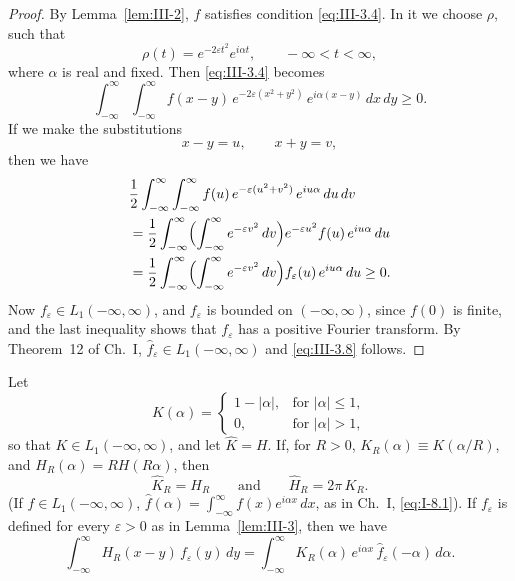 \begin{proof}
By Lemma~\ref{lem:III-2}, $f$ satisfies condition \eqref{eq:III-3.4}. In it we choose $\rho$, such that
\[
\rho(t)=e^{-2\varepsilon t^{2}}e^{i\alpha t},\qquad-\infty<t<\infty,
\]
where $\alpha$ is real and fixed. Then \eqref{eq:III-3.4} becomes
\[
\int_{-\infty}^{\infty}\int_{-\infty}^{\infty}f(x-y)\,e^{-2\varepsilon(x^{2}+y^{2})}\,e^{i\alpha(x-y)}\,dx\,dy\ge0.
\]
If we make the substitutions
\[
x-y=u,\qquad x+y=v,
\]
then we have
\begin{align*}
&\frac12\int_{-\infty}^{\infty}\int_{-\infty}^{\infty}f(u)\,e^{-\varepsilon(u^{2}+v^{2})}\,e^{iu\alpha}\,du\,dv\\
&=\frac12\int_{-\infty}^{\infty}\Bigl(\int_{-\infty}^{\infty}e^{-\varepsilon v^{2}}\,dv\Bigr)e^{-\varepsilon u^{2}}f(u)\,e^{iu\alpha}\,du\\
&=\frac12\int_{-\infty}^{\infty}\Bigl(\int_{-\infty}^{\infty}e^{-\varepsilon v^{2}}\,dv\Bigr)f_{\varepsilon}(u)\,e^{iu\alpha}\,du\ge0.
\end{align*}
Now $f_{\varepsilon}\in L_{1}(-\infty,\infty)$, and $f_{\varepsilon}$ is bounded on $(-\infty,\infty)$, since $f(0)$ is finite, and the last inequality shows that $f_{\varepsilon}$ has a positive Fourier transform. By Theorem~12 of Ch.~I, $\hat f_{\varepsilon}\in L_{1}(-\infty,\infty)$ and \eqref{eq:III-3.8} follows.
\end{proof}

\begin{lemma}\label{lem:III-5}
Let
\[
K(\alpha)=
\begin{cases}
1-|\alpha|,&\text{for }|\alpha|\le1,\\
0,&\text{for }|\alpha|>1,
\end{cases}
\]
so that $K\in L_{1}(-\infty,\infty)$, and let $\hat K=H$. If, for $R>0$, $K_{R}(\alpha)\equiv K(\alpha/R)$, and $H_{R}(\alpha)=RH(R\alpha)$, then
\[
\hat K_{R}=H_{R}\qquad\text{and}\qquad\hat H_{R}=2\pi\,K_{R}.
\]
(If $f\in L_{1}(-\infty,\infty)$, $\hat f(\alpha)=\int_{-\infty}^{\infty}f(x)e^{i\alpha x}\,dx$, as in Ch.~I, \eqref{eq:I-8.1}). If $f_{\varepsilon}$ is defined for every $\varepsilon>0$ as in Lemma~\ref{lem:III-3}, then we have
\begin{equation}\tag{3.9}\label{eq:III-3.9}
\int_{-\infty}^{\infty}H_{R}(x-y)\,f_{\varepsilon}(y)\,dy
=\int_{-\infty}^{\infty}K_{R}(\alpha)\,e^{i\alpha x}\,\hat f_{\varepsilon}(-\alpha)\,d\alpha.
\end{equation}
\end{lemma}

